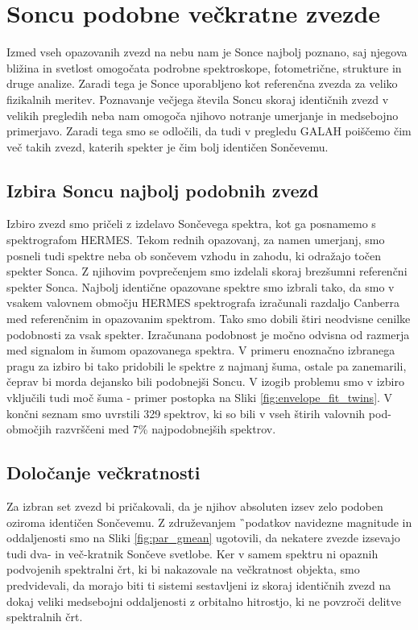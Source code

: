 \section{Soncu podobne večkratne zvezde}
\label{sec:slo_soncevi_veckratniki}
Izmed vseh opazovanih zvezd na nebu nam je Sonce najbolj poznano, saj njegova bližina in svetlost omogočata podrobne spektroskope, fotometrične, strukture in druge analize. Zaradi tega je Sonce uporabljeno kot referenčna zvezda za veliko fizikalnih meritev. Poznavanje večjega števila Soncu skoraj identičnih zvezd v velikih pregledih neba nam omogoča njihovo notranje umerjanje \cite{2010A&A...522A..98M, 2012MNRAS.426..484D} in medsebojno primerjavo. Zaradi tega smo se odločili, da tudi v pregledu GALAH poiščemo čim več takih zvezd, katerih spekter je čim bolj identičen Sončevemu.

\subsection{Izbira Soncu najbolj podobnih zvezd}
Izbiro zvezd smo pričeli z izdelavo Sončevega spektra, kot ga posnamemo s spektrografom HERMES. Tekom rednih opazovanj, za namen umerjanj, smo posneli tudi spektre neba ob sončevem vzhodu in zahodu, ki odražajo točen spekter Sonca. Z njihovim povprečenjem smo izdelali skoraj brezšumni referenčni spekter Sonca. Najbolj identične opazovane spektre smo izbrali tako, da smo v vsakem valovnem območju HERMES spektrografa izračunali razdaljo Canberra \cite{Lance1967MixedDataCP} med referenčnim in opazovanim spektrom. Tako smo dobili štiri neodvisne cenilke podobnosti za vsak spekter. Izračunana podobnost je močno odvisna od razmerja med signalom in šumom opazovanega spektra. V primeru enoznačno izbranega pragu za izbiro bi tako pridobili le spektre z najmanj šuma, ostale pa zanemarili, čeprav bi morda dejansko bili podobnejši Soncu. V izogib problemu smo v izbiro vključili tudi moč šuma - primer postopka na Sliki \ref{fig:envelope_fit_twins}. V končni seznam smo uvrstili 329 spektrov, ki so bili v vseh štirih valovnih pod-območjih razvrščeni med 7\% najpodobnejših spektrov.

\subsection{Določanje večkratnosti}
Za izbran set zvezd bi pričakovali, da je njihov absoluten izsev zelo podoben oziroma identičen Sončevemu. Z združevanjem \G\ podatkov navidezne magnitude in oddaljenosti \cite{2018AJ....156...58B} smo na Sliki \ref{fig:par_gmean} ugotovili, da nekatere zvezde izsevajo tudi dva- in več-kratnik Sončeve svetlobe. Ker v samem spektru ni opaznih podvojenih spektralni črt, ki bi nakazovale na večkratnost objekta, smo predvidevali, da morajo biti ti sistemi sestavljeni iz skoraj identičnih zvezd na dokaj veliki medsebojni oddaljenosti z orbitalno hitrostjo, ki ne povzroči delitve spektralnih črt.

